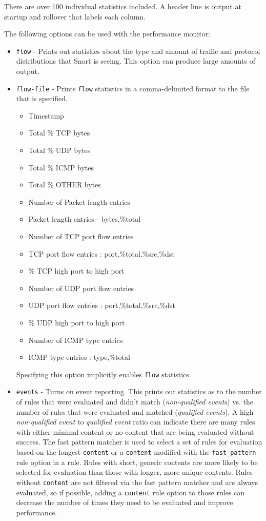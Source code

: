 \documentclass[english]{report}
\begin{document}
There are over 100 individual statistics included.  A header line is output at startup and
rollover that labels each column.

The following options can be used with the performance monitor:

\begin{itemize}

\item \texttt{flow} - Prints out statistics about the type and amount of traffic
and protocol distributions that Snort is seeing. This option can produce large
amounts of output.

\item \texttt{flow-file} - Prints \texttt{flow} statistics in a comma-delimited
format to the file that is specified.
\begin{itemize}
\item Timestamp
\item Total \% TCP bytes
\item Total \% UDP bytes
\item Total \% ICMP bytes
\item Total \% OTHER bytes
\item Number of Packet length entries
\item Packet length entries - bytes,\%total
\item Number of TCP port flow entries
\item TCP port flow entries : port,\%total,\%src,\%dst
\item \% TCP high port to high port
\item Number of UDP port flow entries
\item UDP port flow entries : port,\%total,\%src,\%dst
\item \% UDP high port to high port
\item Number of ICMP type entries
\item ICMP type entries : type,\%total
\end{itemize}
Specifying this option implicitly enables \texttt{flow} statistics.

\item \texttt{events} - Turns on event reporting.  This prints out statistics
as to the number of rules that were evaluated and didn't match
(\textit{non-qualified events}) vs. the number of rules that were evaluated and
matched (\textit{qualified events}).  A high \textit{non-qualified event} to
\textit{qualified event} ratio can indicate there are many rules with either
minimal content or no content that are being evaluated without success.  The
fast pattern matcher is used to select a set of rules for evaluation based on
the longest \texttt{content} or a \texttt{content} modified with the
\texttt{fast\_pattern} rule option in a rule.  Rules with short, generic
contents are more likely to be selected for evaluation than those with
longer, more unique contents.  Rules without \texttt{content} are not
filtered via the fast pattern matcher and are always evaluated, so if
possible, adding a \texttt{content} rule option to those rules can decrease the
number of times they need to be evaluated and improve performance.


\end{itemize}
\end{document}
